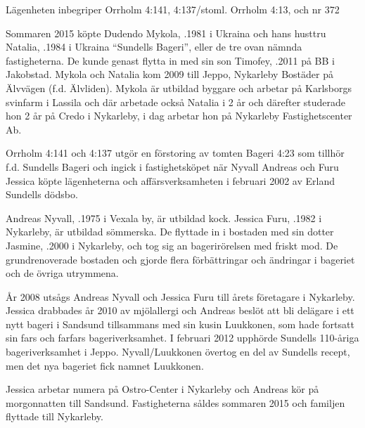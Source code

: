 
Lägenheten inbegriper Orrholm 4:141, 4:137/stoml. Orrholm 4:13, och nr 372



Sommaren 2015 köpte Dudendo Mykola, .1981 i Ukraina och hans husttru Natalia, .1984 i Ukraina ``Sundells Bageri'', eller de tre ovan nämnda fastigheterna. De kunde genast flytta in med sin son Timofey, .2011 på BB i Jakobstad. Mykola och Natalia kom 2009 till Jeppo, Nykarleby Bostäder på Älvvägen (f.d. Älvliden). Mykola är utbildad byggare och arbetar på Karlsborgs svinfarm i Lassila och där arbetade också Natalia i 2 år och därefter studerade hon 2 år på Credo i Nykarleby, i dag arbetar hon på Nykarleby Fastighetscenter Ab.


Orrholm  4:141 och 4:137 utgör en förstoring av tomten Bageri 4:23 som tillhör f.d. Sundells Bageri och ingick i fastighetsköpet när Nyvall Andreas och Furu Jessica köpte lägenheterna och affärsverksamheten i februari 2002 av Erland Sundells dödsbo.

Andreas Nyvall, .1975 i Vexala by, är utbildad kock. Jessica Furu, .1982 i Nykarleby, är utbildad sömmerska. De flyttade in i bostaden med sin dotter Jasmine, .2000 i Nykarleby, och tog sig an bagerirörelsen med friskt mod. De grundrenoverade bostaden och gjorde flera förbättringar och ändringar i bageriet och de övriga utrymmena.


År 2008 utsågs Andreas Nyvall och Jessica Furu till årets företagare i Nykarleby. Jessica drabbades år 2010 av mjölallergi och Andreas beslöt att bli delägare i ett nytt bageri i Sandsund tillsammans med sin kusin Luukkonen, som hade fortsatt sin fars och farfars bageriverksamhet. I februari 2012 upphörde Sundells 110-åriga bageriverksamhet i Jeppo. Nyvall/Luukkonen övertog en del av Sundells recept, men det nya bageriet fick namnet Luukkonen.
\begin{jhchildren}
  \item {}
  \item {}
  \item {}
\end{jhchildren}
Jessica arbetar numera på Ostro-Center i Nykarleby och Andreas kör på morgonnatten till Sandsund. Fastigheterna såldes sommaren 2015 och familjen flyttade till Nykarleby.


